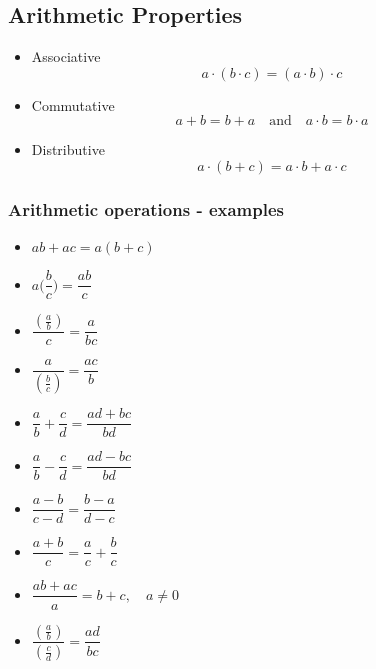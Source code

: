 \documentclass[12pt, a5paper]{article}
\begin{document}
\subsection*{Arithmetic Properties}
\begin{itemize}
\item{Associative $$a \cdot (b \cdot c) = (a \cdot b) \cdot c$$}
\item{Commutative $$a + b = b + a \quad\text{and}\quad a \cdot b = b \cdot a$$}
\item{Distributive $$a \cdot (b + c) = a \cdot b + a \cdot c$$}
\end{itemize}

\subsubsection*{Arithmetic operations - examples}
\begin{itemize}
\item{$ab + ac = a (b + c)$}
\item{$a\Big(\dfrac{b}{c}\Big) = \dfrac{ab}{c}$}
\item{$\dfrac{(\frac{a}{b})}{c} = \dfrac{a}{bc}$}
\item{$\dfrac{a}{(\frac{b}{c})}= \dfrac{ac}{b}$}
\item{$\dfrac{a}{b} + \dfrac{c}{d} = \dfrac{ad + bc}{bd}$}
\item{$\dfrac{a}{b} - \dfrac{c}{d} = \dfrac{ad - bc}{bd}$}
\item{$\dfrac{a - b}{c - d} = \dfrac{b - a}{d - c}$}
\item{$\dfrac{a + b}{c} = \dfrac{a}{c} + \dfrac{b}{c}$}
\item{$\dfrac{ab + ac}{a} = b + c,\quad a \ne 0$}
\item{$\dfrac{(\frac{a}{b})}{(\frac{c}{d})} = \dfrac{ad}{bc}$}
\end{itemize}
\end{document}
